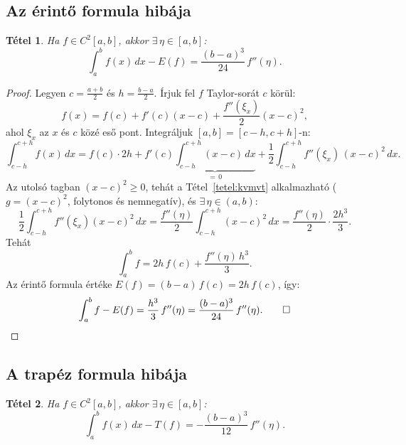 \documentclass[a4paper,12pt]{article}
\theoremstyle{mydef}
\newtheorem{tetel}{Tétel}[section]
\begin{document}
\subsection*{Az érintő formula hibája}

\begin{mdframed}[backgroundcolor=thmbg,linewidth=0pt,innertopmargin=8pt,innerbottommargin=8pt]
\begin{tetel}
\label{tetel:erintohiba}
Ha $f \in C^2[a,b]$, akkor $\exists\,\eta \in [a,b]$:
\[
  \int_a^b f(x)\,dx - E(f) = \frac{(b-a)^3}{24}\,f''(\eta).
\]
\end{tetel}
\end{mdframed}

\begin{proof}
Legyen $c = \tfrac{a+b}{2}$ és $h = \tfrac{b-a}{2}$.
Írjuk fel $f$ Taylor-sorát $c$ körül:
\[
  f(x) = f(c) + f'(c)(x-c) + \frac{f''(\xi_x)}{2}(x-c)^2,
\]
ahol $\xi_x$ az $x$ és $c$ közé eső pont.
Integráljuk $[a,b] = [c-h, c+h]$-n:
\[
  \int_{c-h}^{c+h} f(x)\,dx = f(c)\cdot 2h + f'(c)\underbrace{\int_{c-h}^{c+h}(x-c)\,dx}_{=\,0}
  + \frac{1}{2}\int_{c-h}^{c+h} f''(\xi_x)\,(x-c)^2\,dx.
\]
Az utolsó tagban $(x-c)^2 \ge 0$, tehát a Tétel~\ref{tetel:kvmvt} alkalmazható ($g = (x-c)^2$,
folytonos és nemnegatív), és $\exists\,\eta \in (a,b)$:
\[
  \frac{1}{2}\int_{c-h}^{c+h} f''(\xi_x)(x-c)^2\,dx = \frac{f''(\eta)}{2}\int_{c-h}^{c+h}(x-c)^2\,dx
  = \frac{f''(\eta)}{2}\cdot\frac{2h^3}{3}.
\]
Tehát
\[
  \int_a^b f = 2h\,f(c) + \frac{f''(\eta)\,h^3}{3}.
\]
Az érintő formula értéke $E(f) = (b-a)\,f(c) = 2h\,f(c)$, így:
\[
  \int_a^b f - E(f) = \frac{h^3}{3}\,f''(\eta) = \frac{(b-a)^3}{24}\,f''(\eta). \qed
\]
\end{proof}

\subsection*{A trapéz formula hibája}

\begin{mdframed}[backgroundcolor=thmbg,linewidth=0pt,innertopmargin=8pt,innerbottommargin=8pt]
\begin{tetel}
\label{tetel:trapezhiba}
Ha $f \in C^2[a,b]$, akkor $\exists\,\eta \in [a,b]$:
\[
  \int_a^b f(x)\,dx - T(f) = -\frac{(b-a)^3}{12}\,f''(\eta).
\]
\end{tetel}
\end{mdframed}
\end{document}
